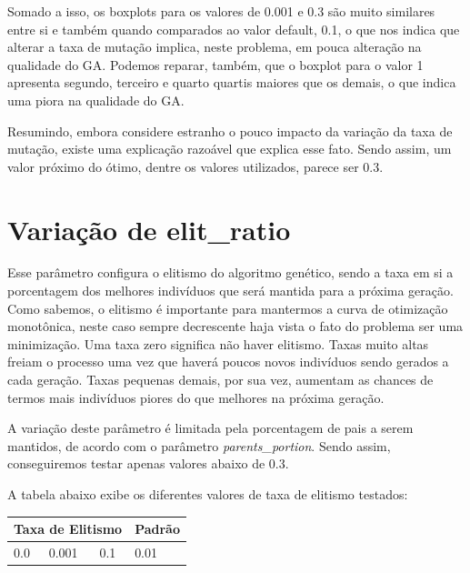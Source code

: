 \documentclass[12pt]{article}
\begin{document}
	Somado a isso, os boxplots para os valores de 0.001 e 0.3 são muito similares entre si e também quando comparados ao valor default, 0.1, o que nos indica que alterar a taxa de mutação implica, neste problema, em pouca alteração na qualidade do GA. Podemos reparar, também, que o boxplot para o valor 1 apresenta segundo, terceiro e quarto quartis maiores que os demais, o que indica uma piora na qualidade do GA.
	
	Resumindo, embora considere estranho o pouco impacto da variação da taxa de mutação, existe uma explicação razoável que explica esse fato. Sendo assim, um valor próximo do ótimo, dentre os valores utilizados, parece ser 0.3.
	
	\section{Variação de elit\_ratio}
	
	Esse parâmetro configura o elitismo do algoritmo genético, sendo a taxa em si a porcentagem dos melhores indivíduos que será mantida para a próxima geração. Como sabemos, o elitismo é importante para mantermos a curva de otimização monotônica, neste caso sempre decrescente haja vista o fato do problema ser uma minimização. Uma taxa zero significa não haver elitismo. Taxas muito altas freiam o processo uma vez que haverá poucos novos indivíduos sendo gerados a cada geração. Taxas pequenas demais, por sua vez, aumentam as chances de termos mais indivíduos piores do que melhores na próxima geração.
	
	A variação deste parâmetro é limitada pela porcentagem de pais a serem mantidos, de acordo com o parâmetro \textit{parents\_portion}. Sendo assim, conseguiremos testar apenas valores abaixo de $0.3$.
	
	A tabela abaixo exibe os diferentes valores de taxa de elitismo testados:
	
	\begin{table}[H]
		\centering
		\begin{tabular}{|l|l|l|l|}
			\hline
			\multicolumn{3}{|l|}{Taxa de Elitismo} & Padrão \\ \hline
			0.0    & 0.001    & 0.1    & 0.01    \\ \hline
		\end{tabular}
	\end{table}
	
\end{document}
